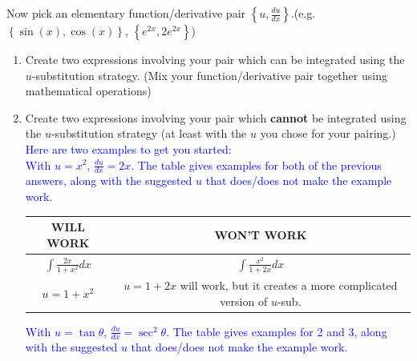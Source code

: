 \documentclass{ximera}
\begin{document}
\begin{exercise}
    Now pick an elementary function/derivative pair $\left\{ u, \frac{du}{dx}\right\}$.(e.g. $\left\{\sin(x),\cos(x)\right\}$, $\left\{e^{2x},2e^{2x}\right\}$) \\
    \begin{enumerate}
    
    \item Create two expressions involving your pair which can be integrated using the $u$-substitution strategy. (Mix your function/derivative pair together using mathematical operations)


    \item Create two expressions involving your pair which {\bf{cannot}} be integrated using the $u$-substitution strategy (at least with the $u$ you chose for your pairing.)\\
    \textcolor{blue}{Here are two examples to get you started:}\\
        \textcolor{blue}{
        With $u = x^2$, $\frac{du}{dx} = 2x$.  The table gives examples for both of the previous answers, along with the suggested $u$ that does/does not make the example work.}
        
        \begin{center}\begin{tabular}{cc}
        WILL WORK & WON'T WORK\\\hline
        $\int\frac{2x}{1+x^2}dx$ & $\int\frac{x^2}{1+2x}dx$ \\
        $u=1+x^2$ & $u=1+2x$ will work, but it creates a more complicated version of $u$-sub. \end{tabular}\end{center}
    
    \textcolor{blue}{
        With $u = \tan\theta $, $\frac{du}{dx} = \sec^2\theta$. The table gives examples for 2 and 3, along with the suggested $u$ that does/does not make the example work.}
       

\end{enumerate}
\end{exercise}
\end{document}
